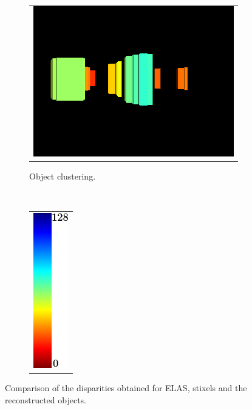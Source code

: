 \begin{figure}[h!]
\begin{subfigure}[b]{0.25\textwidth}
        \end{subfigure}%
        ~
        \begin{subfigure}[b]{0.25\textwidth}
	  \begin{tabular}{c}
	    \includegraphics[width=\textwidth]{objects}
	  \end{tabular}
	  \caption{Object clustering.}\label{fig:cp04_reconstruction_objects}
        \end{subfigure}%
        ~
        \begin{subfigure}[b]{0.25\textwidth}
	  \centering
	  \begin{tabular}{c}
	    \includegraphics[height=0.375\figuresheight]{colorscale_jet}
	  \end{tabular}
	  \caption*{}\label{fig:cp04_reconstruction_colorscale}
        \end{subfigure}%
        \caption{Comparison of the disparities obtained for \ac{ELAS}, stixels and the reconstructed objects.}\label{fig:cp04_reconstruction}
\end{figure}

